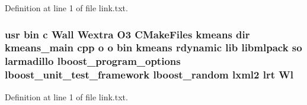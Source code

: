 Definition at line 1 of file link.\-txt.

\subsubsection[{Wl}]{\setlength{\rightskip}{0pt plus 5cm}usr bin c Wall Wextra O3 C\-Make\-Files kmeans dir kmeans\-\_\-main cpp o o bin kmeans rdynamic lib libmlpack so larmadillo lboost\-\_\-program\-\_\-options lboost\-\_\-unit\-\_\-test\-\_\-framework lboost\-\_\-random lxml2 lrt Wl}\label{methods_2kmeans_2CMakeFiles_2kmeans_8dir_2link_8txt_ad4a8760d53806b2eea59e0c5eb1ee92f}


Definition at line 1 of file link.\-txt.

